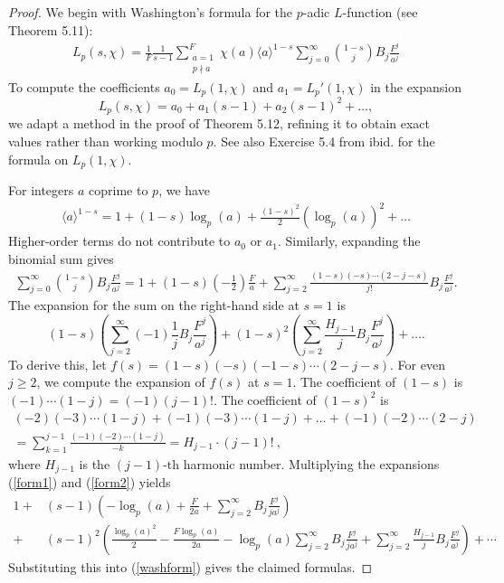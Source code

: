 \documentclass[pdflatex,sn-mathphys-num]{sn-jnl}%
\theoremstyle{plain}
\theoremstyle{definition}
\theoremstyle{remark}
\numberwithin{equation}{section}
\begin{document}
\begin{proof} We begin with Washington's formula for the $p$-adic $L$-function (see \cite{Wa2} Theorem 5.11):
\begin{align} L_p(s,\chi) = \frac{1}{F} \frac{1}{s-1} \sum _{\substack{a=1 \\ p \nmid a}}^F \chi(a) \langle a \rangle^{1-s} \sum_{j=0}^{\infty} \binom{1-s}{j} B_j \frac{F^j}{a^j} 
\label{washform}
\end{align}
To compute  the coefficients $a_0 = L_p(1,\chi)$ and $a_1 = L_p'(1,\chi)$ in the expansion $$L_p(s,\chi) = a_0 + a_1 (s-1) + a_2 (s-1)^2 + \dots ,$$ we adapt a  
method in  the proof of \cite{Wa2} Theorem 5.12, refining it to obtain exact values rather than working modulo $p$. See also Exercise 5.4 from ibid. for the formula on $L_p(1,\chi)$.

For integers $a$ coprime to $p$, we have
\begin{align} \langle a \rangle^{1-s} = 1+ (1-s) \log_p(a) + \frac{(1-s)^2}{2} (\log_p(a))^2 + \dots 
\label{form1}
\end{align}
Higher-order terms do not contribute to $a_0$ or $a_1$. Similarly, expanding the binomial sum gives
\begin{align}
 \sum_{j=0}^{\infty} \binom{1-s}{j} B_j \frac{F^j}{a^j} = 1 + (1-s) ( - \frac{1}{2} ) \frac{F}{a} + \sum_{j=2}^{\infty} \frac{(1-s) (-s) \cdots (2-j-s) }{j!} B_j \frac{F^j}{a^j}  .
 \label{form2}
 \end{align}
 The expansion for the sum on the right-hand side at $s=1$ is
$$ (1-s) \left( \sum_{j=2}^{\infty} (-1) \frac{1}{j} B_j \frac{F^j}{a^j} \right) + (1-s)^2 \left(  \sum_{j=2}^{\infty}  \frac{H_{j-1}}{j}  B_j \frac{F^j}{a^j} \right) + \dots .$$
To derive this, let $f(s) =  (1-s)(-s) (-1-s) \cdots (2-j-s)$. For even $j \geq 2$, we compute the expansion of $f(s)$ at $s=1$. The coefficient of $(1-s)$ is 
$(-1) \cdots (1-j) = (-1) (j-1)!$. The coefficient of $(1-s)^2$ is
\begin{align*}
 (-2)(-3) \cdots (1-j) +  (-1)(-3) \cdots (1-j) + \dots +  (-1)(-2) \cdots (2-j) \\ = \sum_{k=1}^{j-1} \frac{(-1)(-2) \cdots (1-j)}{-k} = H_{j-1} \cdot (j-1)! \ ,
 \end{align*}
 where $H_{j-1}$ is the $(j-1)$-th harmonic number.
 Multiplying the expansions (\ref{form1}) and (\ref{form2}) yields
 \begin{align*} 1+ & (s-1)  \left(- \log_p(a) + \frac{F}{2a} + \sum_{j=2}^{\infty} B_j \frac{F^{j}}{j a^j} \right) \\
 + & (s-1)^2   \left( \frac{\log_p(a)^2}{2}   -  \frac{F \log_p(a)}{2a} - \log_p(a) \sum_{j=2}^{\infty} B_j \frac{F^{j}}{j a^j} +  
\sum_{j=2}^{\infty} \frac{H_{j-1}}{j} B_j \frac{F^{j}}{a^j} \right) + \cdots
 \end{align*}
 Substituting this into (\ref{washform}) gives the claimed formulas.
\end{proof}
\end{document}
